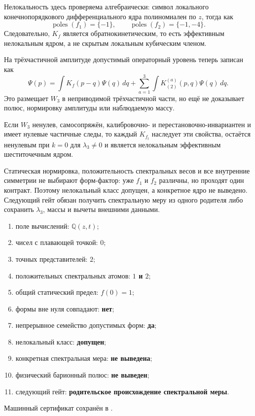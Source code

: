 Нелокальность здесь проверяема алгебраически: символ локального
конечнопорядкового дифференциального ядра полиномиален по $z$, тогда как
\begin{equation}
 \operatorname{poles}(f_1)=\{-1\},
 \qquad
 \operatorname{poles}(f_2)=\{-1,-4\}.
 \label{eq:v8-baryon-nonlocal-pole-test}
\end{equation}
Следовательно, $K_f$ является обратнокинетическим, то есть эффективным
нелокальным ядром, а не скрытым локальным кубическим членом.

На трёхчастичной амплитуде допустимый операторный уровень теперь записан как
\begin{equation}
 \Psi(p)=\int K_f(p-q)\Psi(q)\,dq
 +\sum_{a=1}^{3}\int K_{(2)}^{(a)}(p,q)\Psi(q)\,dq.
 \label{eq:v8-baryon-nonlocal-faddeev-placement}
\end{equation}
Это размещает $W_3$ в неприводимой трёхчастичной части, но ещё не доказывает
полюс, нормировку амплитуды или наблюдаемую массу.

\begin{theorem}
Если $W_3$ ненулев, самосопряжён, калибровочно- и перестановочно-инвариантен
и имеет нулевые частичные следы, то каждый $K_{f_t}$ наследует эти свойства,
остаётся ненулевым при $k=0$ для $\lambda_3\ne0$ и является нелокальным
эффективным шеститочечным ядром.
\end{theorem}

\begin{nogocriterion}
Статическая нормировка, положительность спектральных весов и все внутренние
симметрии не выбирают форм-фактор: уже $f_1$ и $f_2$ различны, но проходят
один контракт. Поэтому нелокальный класс допущен, а конкретное ядро не
выведено. Следующий гейт обязан получить спектральную меру из одного
родителя либо сохранить $\lambda_3$, массы и вычеты внешними данными.
\end{nogocriterion}

\begin{protocol}
\begin{enumerate}
 \item поле вычислений: \textbf{$\mathbb Q(z,t)$};
 \item чисел с плавающей точкой: \textbf{$0$};
 \item точных представителей: \textbf{$2$};
 \item положительных спектральных атомов: \textbf{$1$ и $2$};
 \item общий статический предел: \textbf{$f(0)=1$};
 \item формы вне нуля совпадают: \textbf{нет};
 \item непрерывное семейство допустимых форм: \textbf{да};
 \item нелокальный класс: \textbf{допущен};
 \item конкретная спектральная мера: \textbf{не выведена};
 \item физический барионный полюс: \textbf{не выведен};
 \item следующий гейт: \textbf{родительское происхождение спектральной меры}.
\end{enumerate}
\end{protocol}

Машинный сертификат сохранён в
.